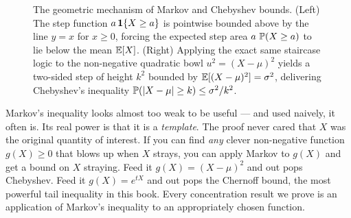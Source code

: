 \begin{figure}[H]
\caption{The geometric mechanism of Markov and Chebyshev bounds. (Left) The step function $a\,\ind\{X \ge a\}$ is pointwise bounded above by the line $y=x$ for $x \ge 0$, forcing the expected step area $a\,\P(X \ge a)$ to lie below the mean $\E[X]$. (Right) Applying the exact same staircase logic to the non-negative quadratic bowl $u^2 = (X-\mu)^2$ yields a two-sided step of height $k^2$ bounded by $\E[(X-\mu)^2] = \sigma^2$, delivering Chebyshev's inequality $\P(|X-\mu| \ge k) \le \sigma^2/k^2$.}
\label{ch19:fig-markov}
\end{figure}

\begin{happeningbox}
Markov's inequality looks almost too weak to be useful --- and used naively,
it often is. Its real power is that it is a \emph{template}. The proof never
cared that $X$ was the original quantity of interest. If you can find
\emph{any} clever non-negative function $g(X) \ge 0$ that blows up when $X$
strays, you can apply Markov to $g(X)$ and get a bound on $X$ straying. Feed
it $g(X) = (X-\mu)^2$ and out pops Chebyshev. Feed it
$g(X) = e^{tX}$ and out pops the Chernoff bound, the most powerful tail
inequality in this book. Every concentration result we prove is an application
of Markov's inequality to an appropriately chosen function.
\end{happeningbox}

